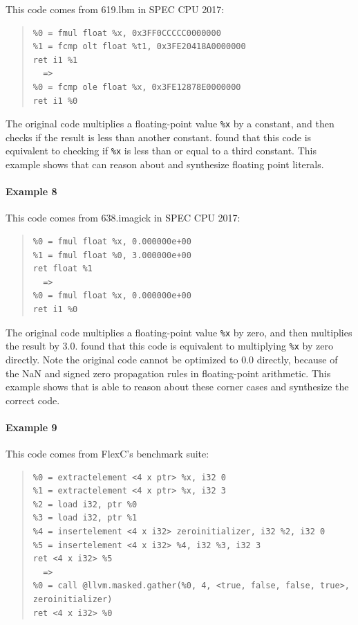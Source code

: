 This code comes from 619.lbm in SPEC CPU 2017:


{\begin{quote}\begin{verbatim}
%0 = fmul float %x, 0x3FF0CCCCC0000000
%1 = fcmp olt float %t1, 0x3FE20418A0000000
ret i1 %1
  =>
%0 = fcmp ole float %x, 0x3FE12878E0000000
ret i1 %0
\end{verbatim}
\end{quote}}

The original code multiplies a floating-point value \texttt{\%x} by a
constant, and then checks if the result is less than another constant.
\minotaur{} found that this code is equivalent to checking if \texttt{\%x}
is less than or equal to a third constant.
%
This example shows that \minotaur{} can reason about and synthesize floating
point literals.


\paragraph*{Example 8}

This code comes from 638.imagick in SPEC CPU 2017:

{\begin{quote}\begin{verbatim}
%0 = fmul float %x, 0.000000e+00
%1 = fmul float %0, 3.000000e+00
ret float %1
  =>
%0 = fmul float %x, 0.000000e+00
ret i1 %0
\end{verbatim}
\end{quote}}

The original code multiplies a floating-point value \texttt{\%x} by
zero, and then multiplies the result by 3.0. \minotaur{} found that this
code is equivalent to multiplying \texttt{\%x} by zero directly.
Note the original code cannot be optimized to 0.0 directly, because of
the NaN and signed zero propagation rules in floating-point arithmetic.
This example shows that \minotaur{} is able to reason about these corner
cases and synthesize the correct code.

\paragraph*{Example 9}

This code comes from FlexC's benchmark suite:

{\begin{quote}\begin{verbatim}
%0 = extractelement <4 x ptr> %x, i32 0
%1 = extractelement <4 x ptr> %x, i32 3
%2 = load i32, ptr %0
%3 = load i32, ptr %1
%4 = insertelement <4 x i32> zeroinitializer, i32 %2, i32 0
%5 = insertelement <4 x i32> %4, i32 %3, i32 3
ret <4 x i32> %5
  =>
%0 = call @llvm.masked.gather(%0, 4, <true, false, false, true>, zeroinitializer)
ret <4 x i32> %0
\end{verbatim}
\end{quote}}

